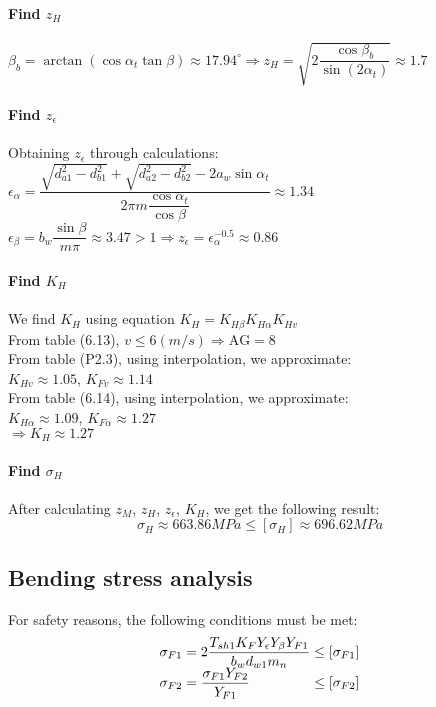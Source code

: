 \paragraph{Find $ z_H $}
$ \beta_b = \arctan\left( \cos\alpha_t\tan\beta\right) \approx 17.94^\circ \Rightarrow z_H = \sqrt{2\dfrac{\cos\beta_b}{\sin(2\alpha_t)}} \approx 1.7$
\paragraph{Find $ z_\epsilon $} Obtaining $ z_\epsilon $ through calculations:\\
$ \epsilon_\alpha = \dfrac{\sqrt{d_{a1}^2-d_{b1}^2}+\sqrt{d_{a2}^2-d_{b2}^2}-2a_w\sin\alpha_{t}}{2\pi m\dfrac{\cos\alpha_t}{\cos\beta}} \approx 1.34$\\
$ \epsilon_\beta = b_w\dfrac{\sin\beta}{m\pi} \approx 3.47>1 \Rightarrow z_\epsilon = \epsilon_\alpha^{-0.5} \approx 0.86 $
\paragraph{Find $ K_H $} We find $ K_H $ using equation $ K_H = K_{H\beta}K_{H\alpha}K_{Hv} $\\
From table (6.13), $ v\leq 6 \unit{(m/s)}\Rightarrow \text{AG} = 8 $ \\
From table (P2.3), using interpolation, we approximate:\\ $ K_{Hv} \approx1.05$, $ K_{Fv} \approx1.14$\\
From table (6.14), using interpolation, we approximate:\\ $ K_{H\alpha} \approx1.09$, $ K_{F\alpha} \approx1.27 $ \\	
$ \Rightarrow K_H \approx 1.27 $
\paragraph{Find $ \sigma_H $} After calculating $ z_M $, $ z_H $, $ z_\epsilon $, $ K_H $, we get the following result:
	\[\sigma_H \approx 663.86\unit{MPa}\leq [\sigma_H] \approx 696.62\unit{MPa}\] 

\subsection{Bending stress analysis}
For safety reasons, the following conditions must be met:
\[
\begin{array}{l@{{} \leq {}}l}
	\sigma_{F1} = 2\dfrac{T_{sh1}K_FY_\epsilon Y_\beta Y_{F1}}{b_wd_{w1}m_n} & [\sigma_{F1}]\\ 
	\sigma_{F2} = \dfrac{\sigma_{F1}Y_{F2}}{Y_{F1}} & [\sigma_{F2}]
\end{array}
\]

